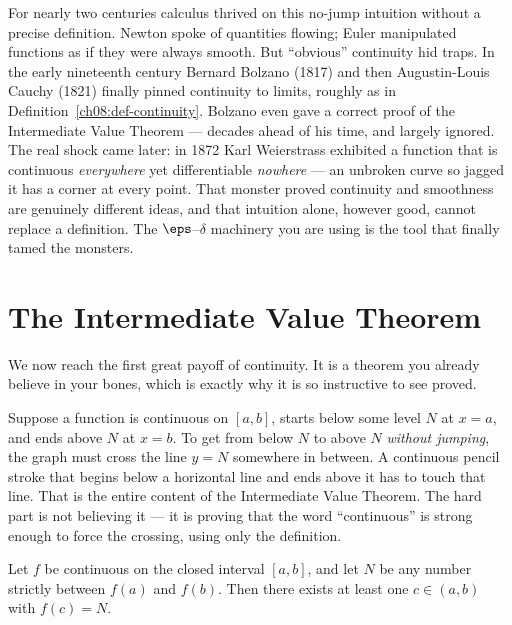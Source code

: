 \begin{historybox}
For nearly two centuries calculus thrived on this no-jump intuition without a precise
definition. Newton spoke of quantities flowing; Euler manipulated functions as if they
were always smooth. But ``obvious'' continuity hid traps. In the early nineteenth century
Bernard Bolzano (1817) and then Augustin-Louis Cauchy (1821) finally pinned continuity to
limits, roughly as in Definition~\ref{ch08:def-continuity}. Bolzano even gave a correct
proof of the Intermediate Value Theorem --- decades ahead of his time, and largely
ignored. The real shock came later: in 1872 Karl Weierstrass exhibited a function that is
continuous \emph{everywhere} yet differentiable \emph{nowhere} --- an unbroken curve so
jagged it has a corner at every point. That monster proved continuity and smoothness are
genuinely different ideas, and that intuition alone, however good, cannot replace a
definition. The $\eps$--$\delta$ machinery you are using is the tool that finally tamed
the monsters.
\end{historybox}

\section{The Intermediate Value Theorem}
\label{ch08:ivt}

We now reach the first great payoff of continuity. It is a theorem you already believe in
your bones, which is exactly why it is so instructive to see proved.

\begin{intuitionbox}
Suppose a function is continuous on $[a,b]$, starts below some level $N$ at $x=a$, and ends
above $N$ at $x=b$. To get from below $N$ to above $N$ \emph{without jumping}, the graph
must cross the line $y=N$ somewhere in between. A continuous pencil stroke that begins below
a horizontal line and ends above it has to touch that line. That is the entire content of
the Intermediate Value Theorem. The hard part is not believing it --- it is proving that
the word ``continuous'' is strong enough to force the crossing, using only the definition.
\end{intuitionbox}

\begin{theorem}
\label{ch08:thm-ivt}
Let $f$ be continuous on the closed interval $[a,b]$, and let $N$ be any number strictly
between $f(a)$ and $f(b)$. Then there exists at least one $c\in(a,b)$ with $f(c)=N$.
\end{theorem}

